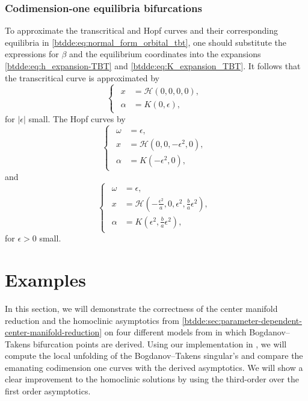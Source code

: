 \subsubsection{Codimension-one equilibria bifurcations}
To approximate the transcritical and Hopf curves and their corresponding equilibria in
\cref{btdde:eq:normal_form_orbital_tbt}, one should substitute the expressions for $\beta$
and the equilibrium coordinates into the expansions \cref{btdde:eq:h_expansion-TBT} and
\cref{btdde:eq:K_expansion_TBT}. It follows that the transcritical curve is approximated by 
\begin{equation*}
\begin{cases}
\begin{aligned}
    x &= \mathcal H\left(0,0,0,0\right), \\
    \alpha &= K(0,\epsilon),
\end{aligned}
\end{cases}
\end{equation*}
for $|\epsilon|$ small. The Hopf curves by
\begin{equation*}
\begin{cases}
\begin{aligned}
    \omega &= \epsilon, \\
    x &= \mathcal H\left(0,0,-\epsilon^2,0\right), \\
    \alpha &= K\left(-\epsilon^2,0\right),
\end{aligned}
\end{cases}
\end{equation*}
and
\begin{equation*}
\begin{cases}
\begin{aligned}
    \omega &= \epsilon, \\
    x &= \mathcal H\left(-\frac{\epsilon^2}{a},0,\epsilon^2,\frac ba\epsilon^2\right), \\
    \alpha &= K\left(\epsilon^2,\frac ba\epsilon^2\right),
\end{aligned}
\end{cases}
\end{equation*}
for $\epsilon > 0$ small.

\section{Examples}
\label{btdde:sec:Examples}

In this section, we will demonstrate the correctness of the center manifold
reduction and the homoclinic asymptotics from
\cref{btdde:sec:parameter-dependent-center-manifold-reduction} on four different
models from
\cite{Jiao2021,giannakopoulos2001bifurcations,jiang2007bogdanov,dong2013bogdanov}
in which Bogdanov--Takens bifurcation points are derived. Using our
implementation in \DDEBIFTOOL, we will compute the local unfolding of the
Bogdanov--Takens singular's and compare the emanating codimension one curves
with the derived asymptotics.  We will show a clear improvement to the
homoclinic solutions by using the third-order over the first order asymptotics. 

